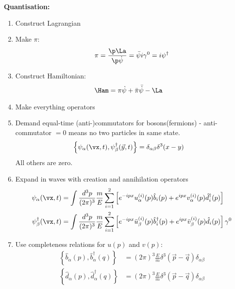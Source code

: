 \documentclass[a4paper, 11pt, normalem]{report}
\begin{document}
\newpage
\textbf{Quantisation:}
\begin{enumerate}
    \item Construct Lagrangian
    \item Make $\pi$:
        \begin{equation}
            \pi = \frac{\p\La}{\p\dot{\psi}} = \bar{\psi}i\gamma^0 = i\psi^\dagger
        \end{equation}
    \item Construct Hamiltonian:
        \begin{align}
            \Ham &= \pi\dot{\psi} + \bar{\pi}\bar{\dot{\psi}} - \La 
        \end{align}
    \item Make everything operators
    \item Demand equal-time (anti-)commutators for bosons(fermions) - anti-commutator $= 0$ means no two particles in same state.
        \begin{align}
            \left\{\psi_\alpha(\vx,t),\psi^\dagger_\beta(\vec{y},t)\right\} &= \delta_{\alpha\beta}\delta^3(x-y) 
        \end{align}
        All others are zero.
    \item Expand in waves with creation and annihilation operators
        \begin{align}
            \psi_\alpha(\vx,t) &= \int \frac{d^3p}{(2\pi)^3} \frac{m}{E} \sum_{i=1}^2\left[e^{-ipx}u_\alpha^{(i)}(p)\hat{b}_i(p) + e^{ipx}v_\alpha^{(i)}(p)\hat{d}^\dagger_i(p) \right]\\
            \psi_\beta^\dagger(\vx,t) &= \int \frac{d^3p}{(2\pi)^3} \frac{m}{E} \sum_{i=1}^2\left[e^{-ipx}\bar{u}_\beta^{(i)}(p)\hat{b}^\dagger_i(p) + e^{ipx}\bar{v}_\beta^{(i)}(p)\hat{d}_i(p) \right]\gamma^0
        \end{align}
    \item Use completeness relations for $u(p)$ and $v(p)$:
        \begin{align}
            \left\{\hat{b}_\alpha(p),\hat{b}_\alpha^\dagger(q)\right\} &= (2\pi)^3\frac{E}{m}\delta^3(\vec{p}-\vec{q})\delta_{\alpha\beta} \\
            \left\{\hat{d}_\alpha(p),\hat{d}_\alpha^\dagger(q)\right\} &= (2\pi)^3\frac{E}{m}\delta^3(\vec{p}-\vec{q})\delta_{\alpha\beta} 
        \end{align}
\end{enumerate}

\chapter{}
\end{document}
